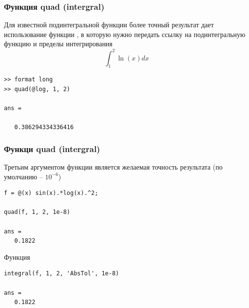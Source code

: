 \documentclass[11pt, compress]{beamer}
\begin{document}
\begin{frame}[fragile,c]
\frametitle{Функция quad (intergral)}
Для известной подинтегральной функции более точный результат дает использование функции , в которую нужно передать ссылку на подинтегральную функцию и пределы интегрирования
$$
\int_1^2 \ln(x) dx 
$$
\begin{lstlisting}
>> format long
>> quad(@log, 1, 2)

ans =

   0.386294334336416
\end{lstlisting}
\end{frame}

\begin{frame}[fragile,c]
\frametitle{Функци quad (intergral)}
Третьим аргументом функции  является желаемая точность результата (по умолчанию -- $10^{-6}$)
\begin{lstlisting}
f = @(x) sin(x).*log(x).^2;

quad(f, 1, 2, 1e-8)

ans =
   0.1822
\end{lstlisting}
Функция  
\begin{lstlisting}
integral(f, 1, 2, 'AbsTol', 1e-8)   

ans =
   0.1822
\end{lstlisting}
\end{frame}
\end{document}
